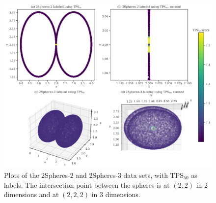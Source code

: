 \begin{figure}[H]
    \centering
    \includegraphics[width=\textwidth]{thesis/figures/two-spheres-2d-3d-tps-scores.pdf}
    \caption{Plots of the 2Spheres-$2$ and 2Spheres-$3$ data sets, with $\text{TPS}_{50}$ as labels. The intersection point between the spheres is at $(2, 2)$ in 2 dimensions and at $(2, 2, 2)$ in 3 dimensions.}
    \label{fig:two-spheres-2d-3d-tps-scores}
\end{figure}

